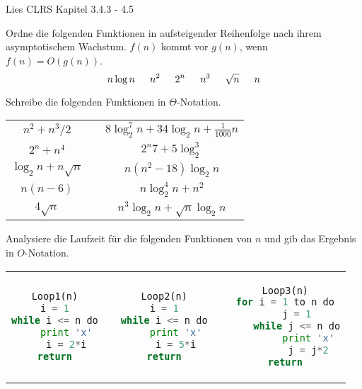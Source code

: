 \documentclass{uebung_cs}
\begin{document}
\begin{aufgabe}\label{lesen}
	Lies CLRS Kapitel 3.4.3 - 4.5
\end{aufgabe}

\begin{aufgabe} \label{tue-first}\mbox{}
	Ordne die folgenden Funktionen in aufsteigender Reihenfolge nach ihrem asymptotischem Wachstum.
	$f(n)$ kommt vor $g(n)$, wenn $f(n) = O(g(n))$.
	\[n \log n\hspace*{15pt} n^2\hspace*{15pt} 2^n\hspace*{15pt} n^3\hspace*{15pt} \sqrt{n}\hspace*{15pt} n\]
	
\end{aufgabe}

\begin{aufgabe}
	Schreibe die folgenden Funktionen in $\Theta$-Notation.
	\begin{center}
		\begin{tabular}{ccc}
			$n^2 + n^3/2$
			&\mbox{}\hspace{2cm}\mbox{}&
			$8\log_2^7 n + 34\log_2 n + \frac{1}{1000}n$\\
			$2^n + n^4$&&
			$2^n7 + 5\log_2^3$\\
			$\log_2n + n\sqrt{n}$&&
			$n(n^2 - 18)\log_2 n$\\
			$n(n-6)$&&
			$n\log_2^4 n + n^2$\\
			$4\sqrt{n}$&&
			$n^3 \log_2 n + \sqrt{n}\log_2 n$
		\end{tabular}
	\end{center}
	
\end{aufgabe}

\begin{aufgabe}
	Analysiere die Laufzeit für die folgenden Funktionen von $n$ und gib das Ergebnis in $O$-Notation.
	\begin{center}
		\begin{tabular}{ccccc}

\begin{lstlisting}[language=Python]
Loop1(n)
i = 1
while i <= n do
	print 'x'
	i = 2*i
return
\end{lstlisting}		
		
			&\mbox{}\hspace{2cm}\mbox{}&

\begin{lstlisting}[language=Python]
Loop2(n)
i = 1
while i <= n do
	print 'x'
	i = 5*i
return
\end{lstlisting}

			
			&\mbox{}\hspace{2cm}\mbox{}&
			
\begin{lstlisting}[language=Python]
Loop3(n)
for i = 1 to n do
	j = 1
	while j <= n do
		print 'x'
		j = j*2
return
\end{lstlisting}
		\end{tabular}
	\end{center}
\end{aufgabe}
\end{document}
